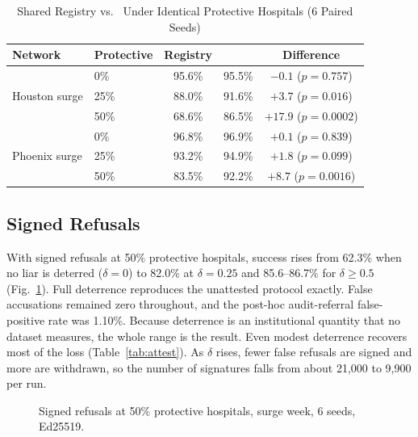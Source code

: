 \begin{table}[!t]
\centering
\caption{Shared Registry vs.\ \mahros{} Under Identical Protective Hospitals (6 Paired Seeds)}
\label{tab:registry}
\scriptsize
\setlength{\tabcolsep}{3pt}
\begin{tabular}{@{}llccc@{}}
\toprule
Network & Protective & Registry & \mahros{} & Difference \\
\midrule
\multirow{3}{*}{Houston surge} & 0\%  & 95.6\% & 95.5\% & $-0.1$ ($p=0.757$) \\
 & 25\% & 88.0\% & 91.6\% & $+3.7$ ($p=0.016$) \\
 & 50\% & 68.6\% & 86.5\% & $+17.9$ ($p=0.0002$) \\
\midrule
\multirow{3}{*}{Phoenix surge} & 0\%  & 96.8\% & 96.9\% & $+0.1$ ($p=0.839$) \\
 & 25\% & 93.2\% & 94.9\% & $+1.8$ ($p=0.099$) \\
 & 50\% & 83.5\% & 92.2\% & $+8.7$ ($p=0.0016$) \\
\bottomrule
\end{tabular}
\end{table}

\subsection{Signed Refusals}
\label{sec:res-attest}
With signed refusals at 50\% protective hospitals, success rises from 62.3\% when no liar is deterred ($\delta=0$) to 82.0\% at $\delta=0.25$ and 85.6--86.7\% for $\delta\ge0.5$ (Fig.~\ref{fig:attest}). Full deterrence reproduces the unattested protocol exactly. False accusations remained zero throughout, and the post-hoc audit-referral false-positive rate was 1.10\%. Because deterrence is an institutional quantity that no dataset measures, the whole range is the result. Even modest deterrence recovers most of the loss (Table~\ref{tab:attest}). As $\delta$ rises, fewer false refusals are signed and more are withdrawn, so the number of signatures falls from about 21,000 to 9,900 per run.

\begin{figure}[!t]
\centering
{}
\caption{Signed refusals at 50\% protective hospitals, surge week, 6 seeds, Ed25519.}
\label{fig:attest}
\end{figure}


